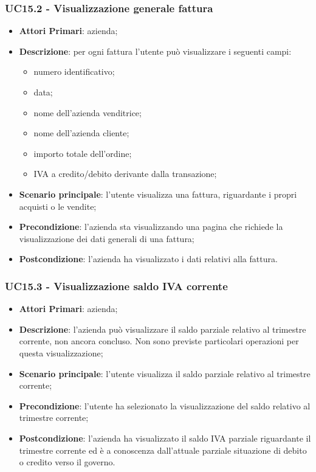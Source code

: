 \subsubsection{UC15.2 - Visualizzazione generale fattura}
\begin{itemize}
	\item \textbf{Attori Primari}: azienda;
	\item \textbf{Descrizione}: per ogni fattura l'utente può visualizzare i seguenti campi:
	\begin{itemize}
		\item numero identificativo;
		\item data;
		\item nome dell'azienda venditrice;
		\item nome dell'azienda cliente;
		\item importo totale dell'ordine;
		\item IVA a credito/debito derivante dalla transazione;
	\end{itemize}
	\item \textbf{Scenario principale}: l'utente visualizza una fattura, riguardante i propri  acquisti o le vendite;
	\item \textbf{Precondizione}: l'azienda sta visualizzando una pagina che richiede la visualizzazione dei dati generali di una fattura;
	\item \textbf{Postcondizione}: l'azienda ha visualizzato i dati relativi alla fattura.
\end{itemize}


\subsubsection{UC15.3 - Visualizzazione saldo IVA corrente}
\begin{itemize}
	\item \textbf{Attori Primari}: azienda;
	\item \textbf{Descrizione}: l'azienda può visualizzare il saldo parziale relativo al trimestre corrente, non ancora concluso. Non sono previste particolari operazioni per questa visualizzazione;
	\item \textbf{Scenario principale}: l'utente visualizza il saldo parziale relativo al trimestre corrente;
	\item \textbf{Precondizione}: l'utente ha selezionato la visualizzazione del saldo relativo al trimestre corrente;
	\item \textbf{Postcondizione}: l'azienda ha visualizzato il saldo IVA parziale riguardante il trimestre corrente ed è a conoscenza dall'attuale parziale situazione di debito o credito verso il governo.
\end{itemize} 

